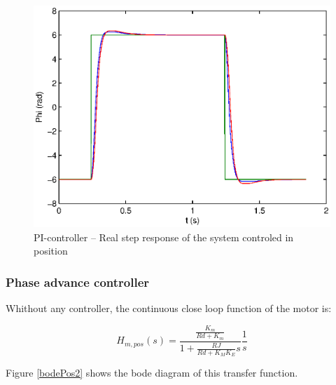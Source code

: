 \begin{center}
\begin{figure}[ht]
 \includegraphics[width=\linewidth]{fig/step_true_pos_tachi.eps}
 \caption{PI-controller -- Real step response of the system controled in position}
 \label{step_true_pos_tachi}
\end{figure}
\end{center}





\subsubsection*{Phase advance controller}

Whithout any controller, the continuous close loop function of the motor is:

$$ H_{m,pos}(s) = \frac{\frac{K_m}{Rd+K_m}}{1+\frac{RJ}{Rd+K_M K_E}s} \frac{1}{s}$$

Figure \ref{bodePos2} shows the bode diagram of this transfer function.

